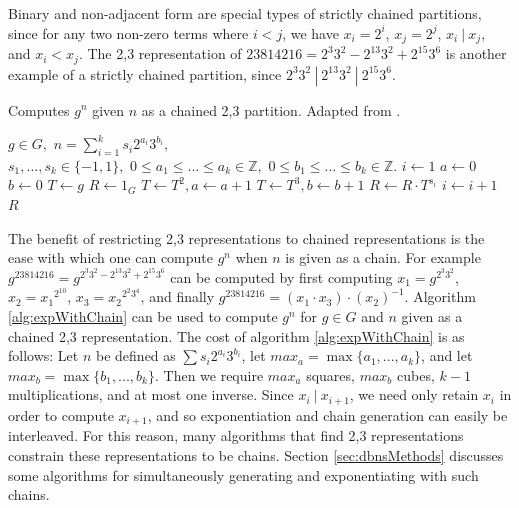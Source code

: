 \documentclass{ucalgthes1}
\theoremstyle{definition}
\newcommand{\ZZ}{\mathbb{Z}}
\begin{document}
\noindent
Binary and non-adjacent form are special types of strictly chained partitions, since for any two non-zero terms where $i < j$, we have $x_i = 2^i$, $x_j = 2^j$, $ x_i ~|~ x_j$, and $x_i < x_j$.  The 2,3 representation of $23814216 = 2^3 3^2 - 2^{13} 3^2 + 2^{15} 3^6$ is another example of a strictly chained partition, since $2^3 3^2 ~|~ 2^{13} 3^2 ~|~ 2^{15} 3^6$.

\begin{algorithm}[h]
\caption{Computes $g^n$ given $n$ as a chained 2,3 partition. Adapted from \cite{Dimitrov2005}.}
\label{alg:expWithChain}
\begin{algorithmic}[1]
\REQUIRE $g \in G,$ 
$n = \sum_{i=1}^k s_i2^{a_i}3^{b_i},$ \\
$s_1,...,s_k \in \{-1, 1\},$ 
$0 \le a_1 \le ...\le a_k \in \ZZ,$ 
$0 \le b_1 \le ... \le b_k \in \ZZ.$
\STATE $i \gets 1$
\STATE $a \gets 0$ 
\STATE $b \gets 0$ 
\STATE $T \gets g$ 
\STATE $R \gets 1_G$
		\STATE $T \gets T^2, a \gets a + 1$
	\ENDWHILE
		\STATE $T \gets T^3, b \gets b + 1$
	\ENDWHILE
	\STATE $R \gets R \cdot T^{s_i}$ 
	\STATE $i \gets i + 1$
\ENDWHILE
\RETURN $R$
\end{algorithmic}
\end{algorithm}

The benefit of restricting 2,3 representations to chained representations is the ease with which one can compute $g^n$ when $n$ is given as a chain.  For example $g^{23814216} = g^{2^3 3^2 - 2^{13} 3^2 + 2^{15} 3^6}$ can be computed by first computing $x_1 = g^{2^3 3^2}$, $x_2 = {x_1}^{2^{10}}$, $x_3 = {x_2}^{2^2 3^4}$, and finally $g^{23814216} = \left(x_1 \cdot x_3\right) \cdot \left(x_2\right)^{-1}$.  Algorithm \ref{alg:expWithChain} can be used to compute $g^n$ for $g \in G$ and $n$ given as a chained 2,3 representation.  The cost of algorithm \ref{alg:expWithChain} is as follows: Let $n$ be defined as $\sum s_i 2^{a_i} 3^{b_i}$, let $max_a = \max \{a_1,...,a_k\}$, and let $max_b = \max \{b_1,...,b_k\}$.  Then we require $max_a$ squares, $max_b$ cubes, $k-1$ multiplications, and at most one inverse.  Since $x_i ~|~ x_{i+1}$, we need only retain $x_i$ in order to compute $x_{i+1}$, and so exponentiation and chain generation can easily be interleaved. For this reason, many algorithms that find 2,3 representations constrain these representations to be chains.  Section \ref{sec:dbnsMethods} discusses some algorithms for simultaneously generating and exponentiating with such chains.
\end{document}
